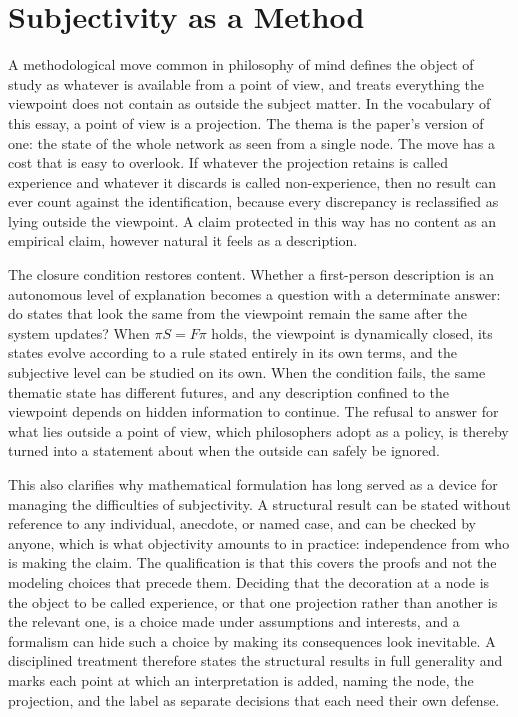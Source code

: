 \documentclass[11pt, a4paper]{article}
\theoremstyle{plain}
\theoremstyle{definition}
\theoremstyle{remark}
\begin{document}
\section{Subjectivity as a Method}

A methodological move common in philosophy of mind defines the object of study as whatever is available from a point of view, and treats everything the viewpoint does not contain as outside the subject matter. In the vocabulary of this essay, a point of view is a projection. The thema is the paper's version of one: the state of the whole network as seen from a single node. The move has a cost that is easy to overlook. If whatever the projection retains is called experience and whatever it discards is called non-experience, then no result can ever count against the identification, because every discrepancy is reclassified as lying outside the viewpoint. A claim protected in this way has no content as an empirical claim, however natural it feels as a description.

The closure condition restores content. Whether a first-person description is an autonomous level of explanation becomes a question with a determinate answer: do states that look the same from the viewpoint remain the same after the system updates? When $\pi S = F\pi$ holds, the viewpoint is dynamically closed, its states evolve according to a rule stated entirely in its own terms, and the subjective level can be studied on its own. When the condition fails, the same thematic state has different futures, and any description confined to the viewpoint depends on hidden information to continue. The refusal to answer for what lies outside a point of view, which philosophers adopt as a policy, is thereby turned into a statement about when the outside can safely be ignored.

This also clarifies why mathematical formulation has long served as a device for managing the difficulties of subjectivity. A structural result can be stated without reference to any individual, anecdote, or named case, and can be checked by anyone, which is what objectivity amounts to in practice: independence from who is making the claim. The qualification is that this covers the proofs and not the modeling choices that precede them. Deciding that the decoration at a node is the object to be called experience, or that one projection rather than another is the relevant one, is a choice made under assumptions and interests, and a formalism can hide such a choice by making its consequences look inevitable. A disciplined treatment therefore states the structural results in full generality and marks each point at which an interpretation is added, naming the node, the projection, and the label as separate decisions that each need their own defense.
\end{document}

